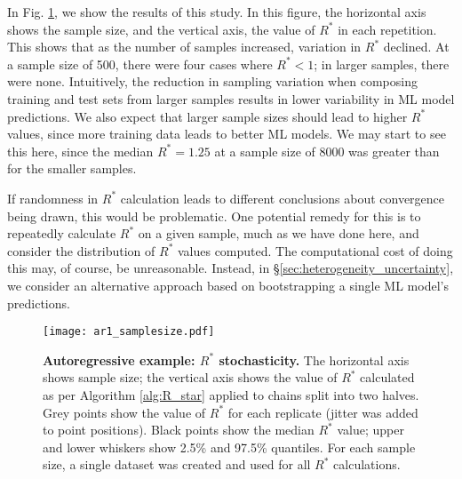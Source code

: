 \documentclass{article}
\begin{document}
In Fig. \ref{fig:ar1_samplesize}, we show the results of this study. In this figure, the horizontal axis shows the sample size, and the vertical axis, the value of $R^*$ in each repetition. This shows that as the number of samples increased, variation in $R^*$ declined. At a sample size of 500, there were four cases where $R^*<1$; in larger samples, there were none. Intuitively, the reduction in sampling variation when composing training and test sets from larger samples results in lower variability in ML model predictions. We also expect that larger sample sizes should lead to higher $R^*$ values, since more training data leads to better ML models. We may start to see this here, since the median $R^*=1.25$ at a sample size of 8000 was greater than for the smaller samples. 

If randomness in $R^*$ calculation leads to different conclusions about convergence being drawn, this would be problematic. One potential remedy for this is to repeatedly calculate $R^*$ on a given sample, much as we have done here, and consider the distribution of $R^*$ values computed. The computational cost of doing this may, of course, be unreasonable. Instead, in \S\ref{sec:heterogeneity_uncertainty}, we consider an alternative approach based on bootstrapping a single ML model's predictions.

\begin{figure}[!htb]
	\centerline{\texttt{[image: ar1\_samplesize.pdf]}}
	\caption{\textbf{Autoregressive example: $R^*$ stochasticity.} The horizontal axis shows sample size; the vertical axis shows the value of $R^*$ calculated as per Algorithm \ref{alg:R_star} applied to chains split into two halves. Grey points show the value of $R^*$ for each replicate (jitter was added to point positions). Black points show the median $R^*$ value; upper and lower whiskers show 2.5\% and 97.5\% quantiles. For each sample size, a single dataset was created and used for all $R^*$ calculations.}
	\label{fig:ar1_samplesize}
\end{figure}
\end{document}
